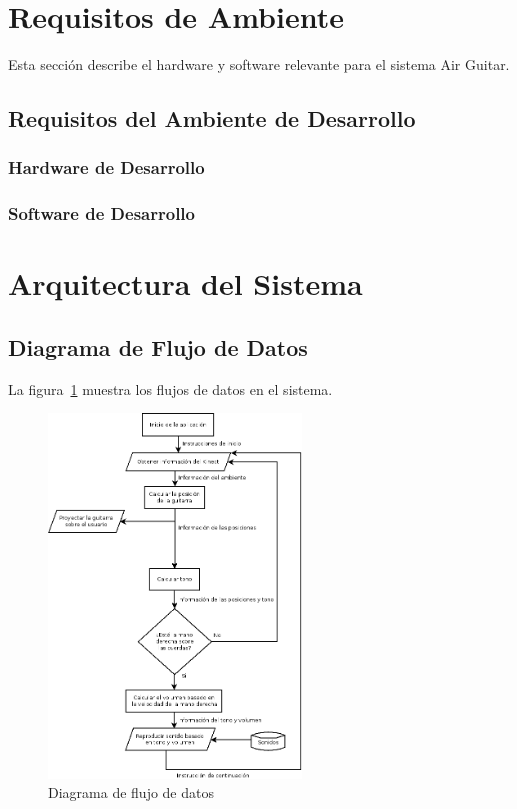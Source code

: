 \documentclass[a4paper,12pt]{article}
\begin{document}
\section{Requisitos de Ambiente}
Esta sección describe el hardware y software relevante para el sistema Air
Guitar.
\subsection{Requisitos del Ambiente de Desarrollo}
\subsubsection{Hardware de Desarrollo}
\subsubsection{Software de Desarrollo}

\section{Arquitectura del Sistema}
\subsection{Diagrama de Flujo de Datos}

La figura~\ref{fig:flujo} muestra los flujos de datos en el sistema.

\begin{figure}[h!]
        \centering
        \includegraphics[width=0.6\textwidth]{../imagenes/diagrama_de_flujo.png}
        \caption{Diagrama de flujo de datos}
        \label{fig:flujo}
\end{figure}
\newpage
\end{document}
